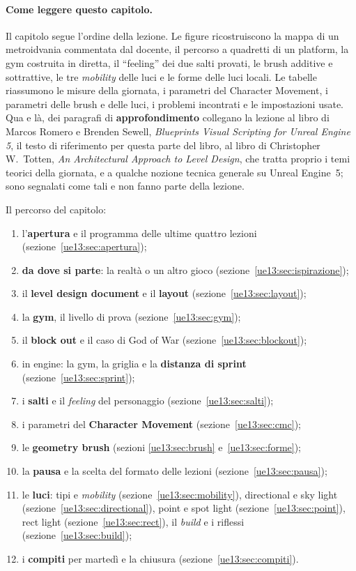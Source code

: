 \paragraph{Come leggere questo capitolo.} Il capitolo segue l'ordine della lezione. Le
figure ricostruiscono la mappa di un metroidvania commentata dal docente, il percorso a
quadretti di un platform, la gym costruita in diretta, il ``feeling'' dei due salti
provati, le brush additive e sottrattive, le tre \emph{mobility} delle luci e le forme
delle luci locali. Le tabelle riassumono le misure della giornata, i parametri del
Character Movement, i parametri delle brush e delle luci, i problemi incontrati e le
impostazioni usate. Qua e là, dei paragrafi di \textbf{approfondimento} collegano la
lezione al libro di Marcos Romero e Brenden Sewell, \emph{Blueprints Visual Scripting for
Unreal Engine 5}, il testo di riferimento per questa parte del libro, al libro di
Christopher W.\ Totten, \emph{An Architectural Approach to Level Design}, che tratta
proprio i temi teorici della giornata, e a qualche nozione tecnica generale su Unreal
Engine~5; sono segnalati come tali e non fanno parte della lezione.

Il percorso del capitolo:
\begin{enumerate}
  \item l'\textbf{apertura} e il programma delle ultime quattro lezioni
        (sezione~\ref{ue13:sec:apertura});
  \item \textbf{da dove si parte}: la realtà o un altro gioco
        (sezione~\ref{ue13:sec:ispirazione});
  \item il \textbf{level design document} e il \textbf{layout}
        (sezione~\ref{ue13:sec:layout});
  \item la \textbf{gym}, il livello di prova (sezione~\ref{ue13:sec:gym});
  \item il \textbf{block out} e il caso di God of War (sezione~\ref{ue13:sec:blockout});
  \item in engine: la gym, la griglia e la \textbf{distanza di sprint}
        (sezione~\ref{ue13:sec:sprint});
  \item i \textbf{salti} e il \emph{feeling} del personaggio
        (sezione~\ref{ue13:sec:salti});
  \item i parametri del \textbf{Character Movement} (sezione~\ref{ue13:sec:cmc});
  \item le \textbf{geometry brush} (sezioni \ref{ue13:sec:brush} e~\ref{ue13:sec:forme});
  \item la \textbf{pausa} e la scelta del formato delle lezioni
        (sezione~\ref{ue13:sec:pausa});
  \item le \textbf{luci}: tipi e \emph{mobility} (sezione~\ref{ue13:sec:mobility}),
        directional e sky light (sezione~\ref{ue13:sec:directional}), point e spot light
        (sezione~\ref{ue13:sec:point}), rect light (sezione~\ref{ue13:sec:rect}), il
        \emph{build} e i riflessi (sezione~\ref{ue13:sec:build});
  \item i \textbf{compiti} per martedì e la chiusura (sezione~\ref{ue13:sec:compiti}).
\end{enumerate}


